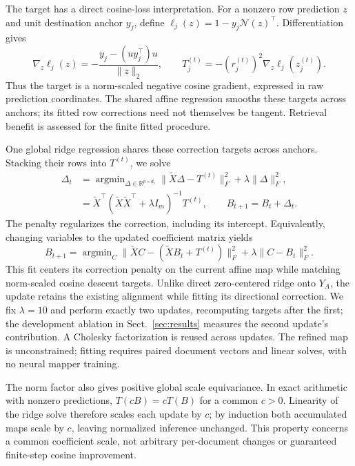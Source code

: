 The target has a direct cosine-loss interpretation. For a nonzero row
prediction $z$ and unit destination anchor $y_j$, define
$\ell_j(z)=1-y_j\mathcal N(z)^\top$. Differentiation gives
\begin{equation}
 \nabla_z\ell_j(z)=-\frac{y_j-(uy_j^\top)u}{\|z\|_2},
 \qquad T_j^{(t)}=-(r_j^{(t)})^2\nabla_z\ell_j(z_j^{(t)}).
 \label{eq:cosine-target}
\end{equation}
Thus the target is a norm-scaled negative cosine gradient, expressed in
raw prediction coordinates. The shared affine regression smooths these
targets across anchors; its fitted row corrections need not themselves
be tangent. Retrieval benefit is assessed for the finite fitted procedure.

One global ridge regression shares these correction targets across anchors.
Stacking their rows into $T^{(t)}$, we solve
\begin{align}
 \Delta_t&=\mathop{\arg\min}_{\Delta\in\mathbb{R}^{p\times d_t}}
 \|\widetilde{X}\Delta-T^{(t)}\|_F^2+\lambda\|\Delta\|_F^2,
 \label{eq:ridge-objective}\\
 &=\widetilde{X}^{\top}
 (\widetilde{X}\widetilde{X}^{\top}+\lambda I_m)^{-1}T^{(t)},
 \qquad B_{t+1}=B_t+\Delta_t .
 \label{eq:tangent-update}
\end{align}
The penalty regularizes the correction, including its intercept. Equivalently,
changing variables to the updated coefficient matrix yields
\begin{equation}
 B_{t+1}=\mathop{\arg\min}_C
 \|\widetilde X C-(\widetilde X B_t+T^{(t)})\|_F^2
 +\lambda\|C-B_t\|_F^2.
 \label{eq:current-prior}
\end{equation}
This fit centers its correction penalty on the current affine map while
matching norm-scaled cosine descent targets. Unlike direct
zero-centered ridge onto $Y_A$, the update retains the existing alignment
while fitting its directional correction. We fix $\lambda=10$ and perform
exactly two updates, recomputing targets after the first; the development
ablation in Sect.~\ref{sec:results} measures the second update's contribution.
A Cholesky
factorization is reused across updates. The refined map is unconstrained;
fitting requires paired document vectors and linear solves, with no neural
mapper training.

The norm factor also gives positive global scale equivariance. In exact
arithmetic with nonzero predictions, $T(cB)=cT(B)$ for a common $c>0$.
Linearity of the ridge solve therefore scales each update by $c$; by
induction both accumulated maps scale by $c$, leaving normalized inference
unchanged. This property concerns a common coefficient scale, not arbitrary
per-document changes or guaranteed finite-step cosine improvement.

